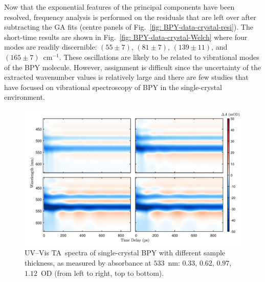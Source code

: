 Now that the exponential features of the principal components have been resolved,
frequency analysis is performed on the residuals that are left over after subtracting the GA fits
(centre panels of Fig.~\ref{fig: BPY-data-crystal-resi}).
The short-time results are shown in Fig.~\ref{fig: BPY-data-crystal-Welch}
where four modes are readily discernible:
$(55 \pm 7)$, $(81 \pm 7)$, $(139 \pm 11)$, and $(165 \pm 7)$~cm$^{-1}$.
%
These oscillations are likely to be related to vibrational modes of the BPY molecule.
However, assignment is difficult since the uncertainty of the extracted wavenumber values is
relatively large and there are few studies that have focused on vibrational spectroscopy of BPY
in the single-crystal environment.

\begin{figure}[ht!]
  \centering
  \includegraphics[width = \textwidth]{Figures/fig_BPY_data_crystal_OD.pdf}
  \caption[UV--Vis TA~spectra of single-crystal BPY with different sample thickness.]{
    UV--Vis TA~spectra of single-crystal BPY
    with different sample thickness, as measured by absorbance at $533$~nm:
    $0.33$, $0.62$, $0.97$, $1.12$~OD (from left to right, top to bottom).
  }
  \label{fig: BPY-data-crystal-OD}
\end{figure}

